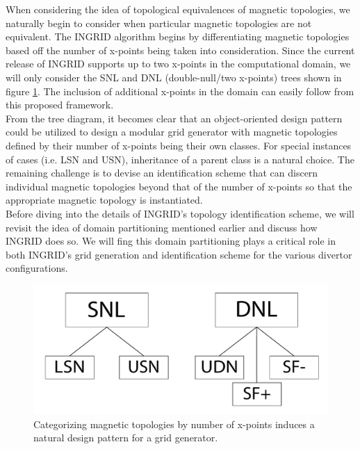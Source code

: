 \indent
When considering the idea of topological equivalences of magnetic topologies, we naturally begin to consider when particular magnetic topologies are not equivalent. The INGRID algorithm begins by differentiating magnetic topologies based off the number of x-points being taken into consideration. Since the current release of INGRID supports up to two x-points in the computational domain, we will only consider the SNL and DNL (double-null/two x-points) trees shown in figure \ref{fig:config_group}. The inclusion of additional x-points in the domain can easily follow from this proposed framework. \\ \indent
From the tree diagram, it becomes clear that an object-oriented design pattern could be utilized to design a modular grid generator with magnetic topologies defined by their number of x-points being their own classes. For special instances of cases (i.e. LSN and USN), inheritance of a parent class is a natural choice. The remaining challenge is to devise an identification scheme that can discern individual magnetic topologies beyond that of the number of x-points so that the appropriate magnetic topology is instantiated.\\
Before diving into the details of INGRID's topology identification scheme, we will revisit the idea of domain partitioning mentioned earlier and discuss how INGRID does so. We will fing this domain partitioning plays a critical role in both INGRID's grid generation and identification scheme for the various divertor configurations.
\begin{figure}
    \centering
    \includegraphics[width=\linewidth]{figures/config_group.pdf}
    \caption{Categorizing magnetic topologies by number of x-points induces a natural design pattern for a grid generator.}
    \label{fig:config_group}
\end{figure}